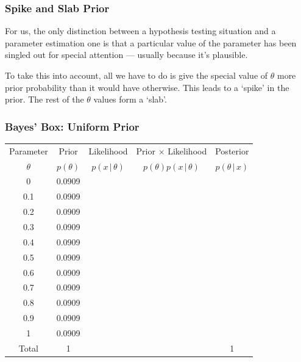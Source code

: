 \documentclass{beamer}
\newcommand{\given}{\,|\,}
\begin{document}
\begin{frame}
\frametitle{Spike and Slab Prior}
For us, the only distinction between a hypothesis testing situation and a
parameter estimation one is that a particular value of the parameter has
been singled out for special attention --- usually because it's plausible.\pause

To take this into account, all we have to do is give the special value of
$\theta$ more prior probability than it would have otherwise. This leads
to a `spike' in the prior. The rest of the $\theta$ values form a `slab'.
\end{frame}


\begin{frame}
\frametitle{Bayes' Box: Uniform Prior}

\centering
{\footnotesize
\begin{tabular}{|c|c|c|c|c|}
\hline
Parameter & Prior & Likelihood & Prior $\times$ Likelihood & Posterior \\
$\theta$  & $p(\theta)$ & $p(x \given \theta)$ & $p(\theta)p(x\given \theta)$ & $p(\theta\given x)$ \\
\hline
0 & 0.0909 &  & & \\
0.1 & 0.0909  &   & & \\
0.2 & 0.0909 &  &  &  \\
0.3 & 0.0909 &  &  &  \\
0.4 & 0.0909 &  &  &  \\
0.5 & 0.0909 &  &  &  \\
0.6 & 0.0909 &  &  &  \\
0.7 & 0.0909 &  &  &  \\
0.8 & 0.0909 &  &  &  \\
0.9 & 0.0909 &  &  &  \\
1 & 0.0909 &  &  &  \\
\hline
Total & 1 & & & 1 \\
\hline
\end{tabular}
}

\end{frame}
\end{document}
